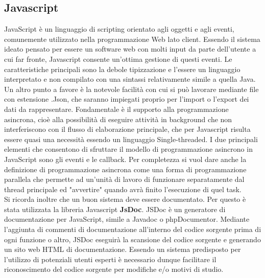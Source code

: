 {\subsection{Javascript}
JavaScript è un linguaggio di scripting orientato agli oggetti e agli eventi, comunemente utilizzato nella programmazione Web lato client. Essendo il sistema ideato pensato per essere un software web con molti input da parte dell'utente a cui far fronte, Javascript consente un'ottima gestione di questi eventi. Le caratteristiche principali sono la debole tipizzazione e l'essere un linguaggio interpretato e non compilato con una sintassi relativamente simile a quella Java.\\
Un altro punto a favore è la notevole facilità con cui si può lavorare mediante file con estensione .Json, che saranno impiegati proprio per l'import o l'export dei dati da rappresentare.
Fondamentale è il supporto alla programmazione asincrona, cioè alla possibilità di eseguire attività in background che non interferiscono con il flusso di elaborazione principale, che per Javascript risulta essere quasi una necessità essendo un linguaggio Single-threaded. I due principali elementi che consentono di sfruttare il modello di programmazione asincrono in JavaScript sono gli eventi e le callback. Per completezza si vuol dare anche la definizione di programmazione asincrona come una forma di programmazione parallela che permette ad un’unità di lavoro di funzionare separatamente dal thread principale ed "avvertire" quando avrà finito l'esecuzione di quel task.\\
Si ricorda inoltre che un buon sistema deve essere documentato. Per questo è stata utilizzata la libreria Javascript \textbf{JsDoc}.
JSDoc è un generatore di documentazione per JavaScript, simile a Javadoc o phpDocumentor. Mediante l'aggiunta di commenti di documentazione all'interno del codice sorgente prima di ogni funzione o altro, JSDoc eseguirà la scansione del codice sorgente e generando un sito web HTML di documentazione. Essendo un sistema predisposto per l'utilizzo di potenziali utenti esperti è necessario dunque facilitare il riconoscimento del codice sorgente per modifiche e/o motivi di studio.
}
